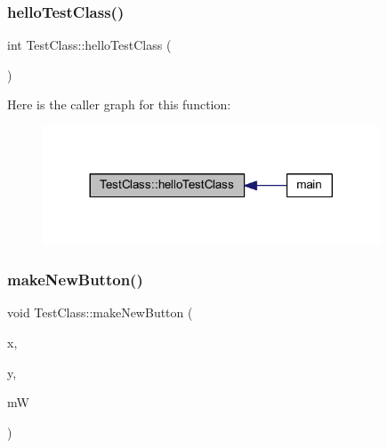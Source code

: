 \subsubsection{\texorpdfstring{hello\+Test\+Class()}{helloTestClass()}}
{\footnotesize\ttfamily int Test\+Class\+::hello\+Test\+Class (\begin{DoxyParamCaption}{ }\end{DoxyParamCaption})}

Here is the caller graph for this function\+:\nopagebreak
\begin{figure}[H]
\begin{center}
\leavevmode
\includegraphics[width=284pt]{class_test_class_a842a304e200248cadf04d06126b51124_icgraph}
\end{center}
\end{figure}
\mbox{\label{class_test_class_ab263a6dea1c83b8206d4fc029f4294fd}} 
\subsubsection{\texorpdfstring{make\+New\+Button()}{makeNewButton()}}
{\footnotesize\ttfamily void Test\+Class\+::make\+New\+Button (\begin{DoxyParamCaption}\item[{int}]{x,  }\item[{int}]{y,  }\item[{\mbox{\hyperlink{class_main_window}{Main\+Window}} $\ast$}]{mW }\end{DoxyParamCaption})}

